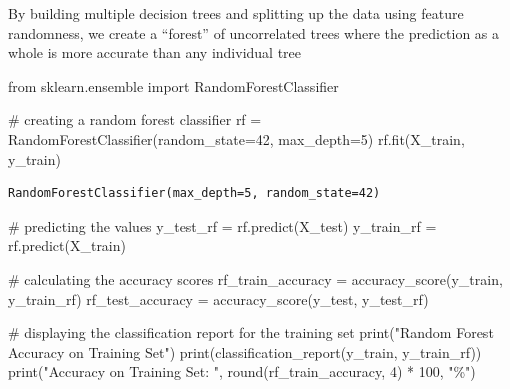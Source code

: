 \documentclass[
  letterpaper,
  DIV=11,
  numbers=noendperiod]{scrartcl}
\newenvironment{Shaded}{\begin{snugshade}}{\end{snugshade}}
\newcommand{\BuiltInTok}[1]{\textcolor[rgb]{0.00,0.23,0.31}{#1}}
\newcommand{\CommentTok}[1]{\textcolor[rgb]{0.37,0.37,0.37}{#1}}
\newcommand{\DecValTok}[1]{\textcolor[rgb]{0.68,0.00,0.00}{#1}}
\newcommand{\ImportTok}[1]{\textcolor[rgb]{0.00,0.46,0.62}{#1}}
\newcommand{\NormalTok}[1]{\textcolor[rgb]{0.00,0.23,0.31}{#1}}
\newcommand{\OperatorTok}[1]{\textcolor[rgb]{0.37,0.37,0.37}{#1}}
\newcommand{\StringTok}[1]{\textcolor[rgb]{0.13,0.47,0.30}{#1}}
\begin{document}
By building multiple decision trees and splitting up the data using
feature randomness, we create a ``forest'' of uncorrelated trees where
the prediction as a whole is more accurate than any individual tree

\begin{Shaded}
\begin{Highlighting}[]
\ImportTok{from}\NormalTok{ sklearn.ensemble }\ImportTok{import}\NormalTok{ RandomForestClassifier}

\CommentTok{\# creating a random forest classifier}
\NormalTok{rf }\OperatorTok{=}\NormalTok{ RandomForestClassifier(random\_state}\OperatorTok{=}\DecValTok{42}\NormalTok{, max\_depth}\OperatorTok{=}\DecValTok{5}\NormalTok{)}
\NormalTok{rf.fit(X\_train, y\_train)}
\end{Highlighting}
\end{Shaded}

\begin{verbatim}
RandomForestClassifier(max_depth=5, random_state=42)
\end{verbatim}

\begin{Shaded}
\begin{Highlighting}[]
\CommentTok{\# predicting the values}
\NormalTok{y\_test\_rf }\OperatorTok{=}\NormalTok{ rf.predict(X\_test)}
\NormalTok{y\_train\_rf }\OperatorTok{=}\NormalTok{ rf.predict(X\_train)}
\end{Highlighting}
\end{Shaded}

\begin{Shaded}
\begin{Highlighting}[]
\CommentTok{\# calculating the accuracy scores}
\NormalTok{rf\_train\_accuracy }\OperatorTok{=}\NormalTok{ accuracy\_score(y\_train, y\_train\_rf)}
\NormalTok{rf\_test\_accuracy }\OperatorTok{=}\NormalTok{ accuracy\_score(y\_test, y\_test\_rf)}
\end{Highlighting}
\end{Shaded}

\begin{Shaded}
\begin{Highlighting}[]
\CommentTok{\# displaying the classification report for the training set}
\BuiltInTok{print}\NormalTok{(}\StringTok{"Random Forest Accuracy on Training Set"}\NormalTok{)}
\BuiltInTok{print}\NormalTok{(classification\_report(y\_train, y\_train\_rf))}
\BuiltInTok{print}\NormalTok{(}\StringTok{"Accuracy on Training Set: "}\NormalTok{, }\BuiltInTok{round}\NormalTok{(rf\_train\_accuracy, }\DecValTok{4}\NormalTok{) }\OperatorTok{*} \DecValTok{100}\NormalTok{, }\StringTok{"\%"}\NormalTok{)}
\end{Highlighting}
\end{Shaded}
\end{document}
